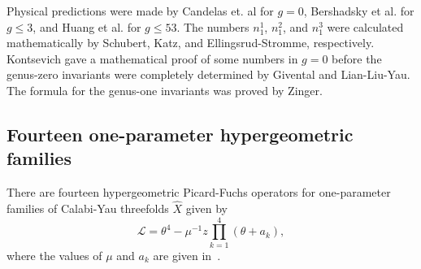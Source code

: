 \documentclass[10pt]{amsart}
\theoremstyle{definition}
\theoremstyle{remark}
\theoremstyle{plain}
\theoremstyle{definition}
\theoremstyle{remark}
\newcommand{\mc}[1]{\mathcal{#1}}
\newcommand{\1}{\mathbf{1}}
\newcommand{\2}{\mathbf{2}}
\newcommand{\3}{\mathbf{3}}
\begin{document}
Physical predictions were made by Candelas et. al for $g=0$, Bershadsky et al. for $g \leq 3$, and Huang et al. for $g \leq 53$.
The numbers $n_1^1$, $n_1^2$, and $n_1^3$ were calculated mathematically by Schubert, Katz, and Ellingsrud-Stromme, respectively. Kontsevich gave a mathematical proof of some numbers in $g=0$ before the genus-zero invariants were completely determined by Givental and Lian-Liu-Yau. The formula for the genus-one invariants was proved by Zinger.

\subsection{Fourteen one-parameter hypergeometric families}%
\label{sub:Fourteen one-parameter hypergeometric families}

There are fourteen hypergeometric Picard-Fuchs operators for one-parameter families of Calabi-Yau threefolds $\hat{X}$ given by
\[ \mc{L} = \theta^4 - \mu^{-1}z \prod_{k=1}^4 (\theta + a_k), \]
where the values of $\mu$ and $a_k$ are given in~.
\end{document}
